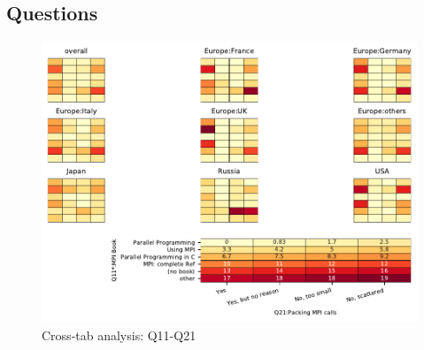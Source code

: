 
\subsection{Questions}


\begin{figure}
\begin{center}
\includegraphics[width=12cm]{../pdfs/Q11-Q21.pdf}
\caption{Cross-tab analysis: Q11-Q21}
\label{fig:Q11-Q21}
\end{center}
\end{figure}
